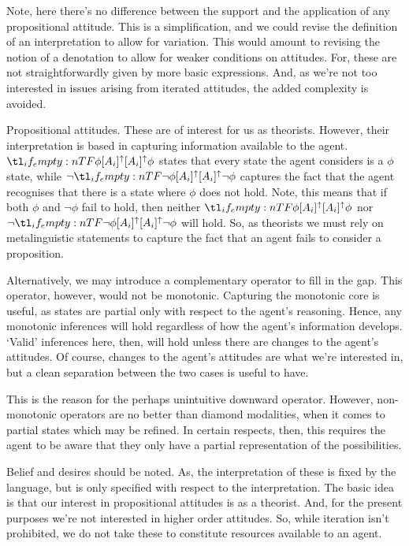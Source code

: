 \documentclass[10pt]{article}
\begin{document}
Note, here there's no difference between the support and the application of any propositional attitude.
This is a simplification, and we could revise the definition of an interpretation to allow for variation.
This would amount to revising the notion of a denotation to allow for weaker conditions on attitudes.
For, these are not straightforwardly given by more basic expressions.
And, as we're not too interested in issues arising from iterated attitudes, the added complexity is avoided.


\begin{note}
  Propositional attitudes.
  These are of interest for us as theorists.
  However, their interpretation is based in capturing information available to the agent.
  \(\lattu{\phi}\) states that every state the agent considers is a \(\phi\) state, while \(\lnot\lattu{\lnot\phi}\) captures the fact that the agent recognises that there is a state where \(\phi\) does not hold.
  Note, this means that if both \(\phi\) and \(\lnot\phi\) fail to hold, then neither \(\lattu{\phi}\) nor \(\lnot\lattu{\lnot\phi}\) will hold.
  So, as theorists we must rely on metalinguistic statements to capture the fact that an agent fails to consider a proposition.

  Alternatively, we may introduce a complementary operator to fill in the gap.
  This operator, however, would not be monotonic.
  Capturing the monotonic core is useful, as states are partial only with respect to the agent's reasoning.
  Hence, any monotonic inferences will hold regardless of how the agent's information develops.
  `Valid' inferences here, then, will hold unless there are changes to the agent's attitudes.
  Of course, changes to the agent's attitudes are what we're interested in, but a clean separation between the two cases is useful to have.

  This is the reason for the perhaps unintuitive downward operator.
  However, non-monotonic operators are no better than diamond modalities, when it comes to partial states which may be refined.
  In certain respects, then, this requires the agent to be aware that they only have a partial representation of the possibilities.
\end{note}



Belief and desires should be noted.
As, the interpretation of these is fixed by the language, but is only specified with respect to the interpretation.
The basic idea is that our interest in propositional attitudes is as a theorist.
And, for the present purposes we're not interested in higher order attitudes.
So, while iteration isn't prohibited, we do not take these to constitute resources available to an agent.
\end{document}
